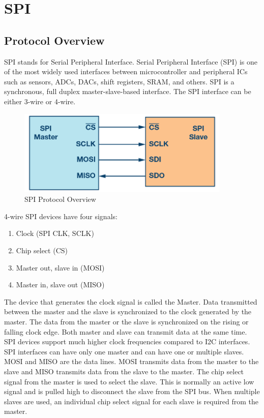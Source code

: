 \section{SPI}
\subsection{Protocol Overview}
SPI stands for Serial Peripheral Interface. Serial Peripheral Interface (SPI) is one of the most widely used interfaces between microcontroller and peripheral ICs such as sensors, ADCs, DACs, shift registers, SRAM, and others. SPI is a synchronous, full duplex master-slave-based interface. The SPI interface can be either 3-wire or 4-wire.

\begin{figure}[H]
\begin{center}
\includegraphics[width=4in]{images/SPI.png}
\caption{SPI Protocol Overview}
\label{SPI}
\end{center}
\end{figure} 

4-wire SPI devices have four signals:
\begin{enumerate}
    \item Clock (SPI CLK, SCLK)
    \item Chip select (CS)
    \item Master out, slave in (MOSI)
    \item Master in, slave out (MISO)
\end{enumerate}

The device that generates the clock signal is called the Master. Data transmitted between the master and the slave is synchronized to the clock generated by the master. The data from the master or the slave is synchronized on the rising or falling clock edge. Both master and slave can transmit data at the same time. SPI devices support much higher clock frequencies compared to I2C interfaces. SPI interfaces can have only one master and can have one or multiple slaves. MOSI and MISO are the data lines. MOSI transmits data from the master to the slave and MISO transmits data from the slave to the master. The chip select signal from the master is used to select the slave. This is normally an active low signal and is pulled high to disconnect the slave from the SPI bus. When multiple slaves are used, an individual chip select signal for each slave is required from the master. 

